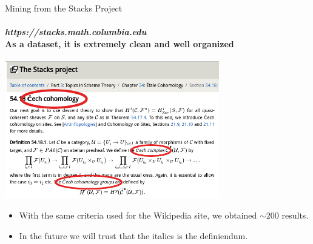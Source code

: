 \documentclass[10pt]{beamer}
\begin{document}
\begin{frame}{Mining from the Stacks Project}
    \framesubtitle{\textit{https://stacks.math.columbia.edu}\\ As a dataset, it is extremely clean and well organized}
    \begin{center}
    \includegraphics[width=0.7\textwidth]{stacks_defs.png}
    \end{center}
    \begin{itemize}
        \item With the same criteria used for the Wikipedia site, we obtained $\sim 200$ results.
        \item In the future we will trust that the italics is the definiendum.
    \end{itemize}
\end{frame}
     
\end{document}
